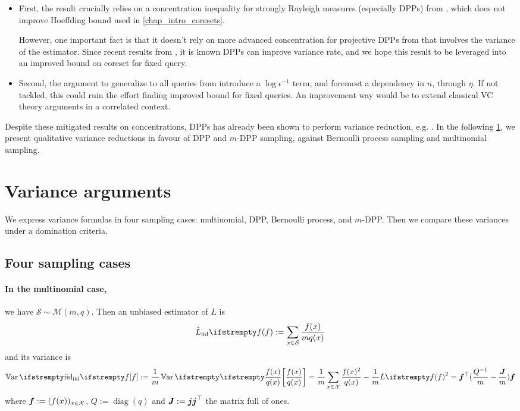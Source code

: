 \begin{itemize}
	\item First, the result crucially relies on a concentration inequality for strongly Rayleigh measures (especially DPPs) from \cite{pemantle2011rayleighconcentration}, which does not improve Hoeffding bound used in \cref{chap_intro_coresets}. 

	However, one important fact is that it doesn't rely on more advanced concentration for projective DPPs from \cite{breuer2013nevai} that involves the variance of the estimator. Since recent results from \cite{bardenet2020mcdpp}, it is known DPPs can improve variance rate, and we hope this result to be leveraged into an improved bound on coreset for fixed query.

	\item Second, the argument to generalize to all queries from \cite{tremblay2018dppcoreset} introduce a $\log \epsilon^{-1}$ term, and foremost a dependency in $n$, through $\eta$. If not tackled, this could ruin the effort finding improved bound for fixed queries. An improvement way would be to extend classical VC theory arguments in a correlated context.
\end{itemize}


Despite these mitigated results on concentrations, DPPs has already been shown to perform variance reduction, e.g. \cite{bardenet2020mcdpp}. In the following \cref{sec__variance_arguments}, we present qualitative variance reductions in favour of DPP and $m$-DPP sampling, against Bernoulli process sampling and multinomial sampling.


\section{Variance arguments}
\label{sec__variance_arguments}
We express variance formulas in four sampling cases: multinomial, DPP, Bernoulli process, and $m$-DPP. Then we compare these variances under a domination criteria.
\subsection{Four sampling cases}
\label{subsec__foursampl}
\paragraph{In the multinomial case,} we have $\mathcal S \sim \mathcal M(m, q)$. Then an unbiased estimator of $L$ is
\begin{equation*}
	\estloss{\textrm{iid}}{\query} := \sum_{x\in \mathcal S} \frac{\query(x)}{m q(x)}
\end{equation*}
and its variance is
\begin{equation*}
	\Var{\textrm{iid}}{\query} :=\frac{1}{m} \Var{}{\frac {\query(x)} {q(x)}}
	=\frac{1}{m} \sum_{x \in \mathcal{X}} \frac{\query(x)^{2}}{q(x)} -\frac{1}{m} \loss{\query}^{2} = \boldsymbol\query\T(\frac{Q^{-1}} m - \frac{\moones} m)\boldsymbol\query
\end{equation*}
where $\boldsymbol{f} := (f(x))_{x\in \mathcal{X}}$, $Q := \operatorname{diag}(q)$ and $\boldsymbol{J} := \boldsymbol{j} \boldsymbol{j} ^\top$ the matrix full of ones. 


